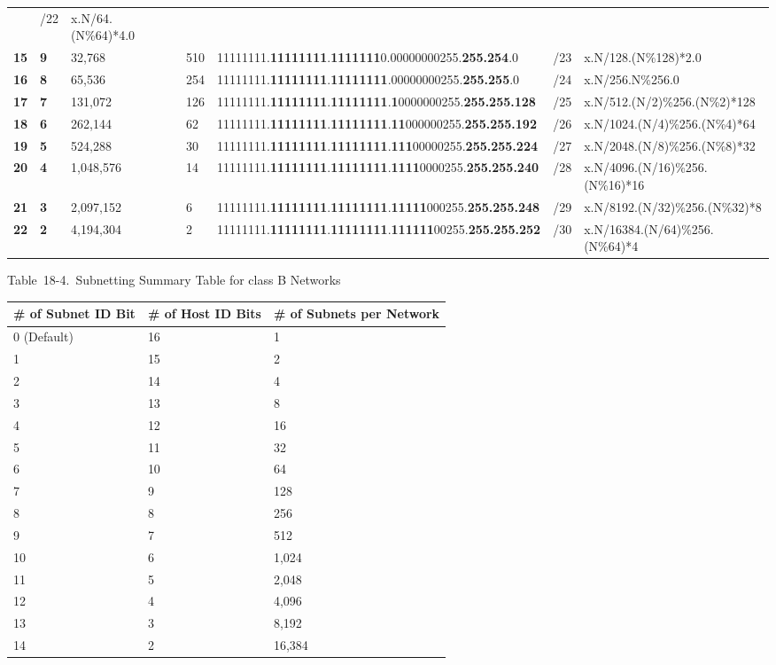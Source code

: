 \documentclass[b5paper,11pt]{memoir}
\begin{document}
\begin{longtable}[]{@{}lllllll@{}}
& /22 & x.N/64.(N\%64)*4.0\tabularnewline
{\textbf{15}} & {\textbf{9}} & 32,768 & 510 &
11111111.{\textbf{11111111}}.{\textbf{1111111}}0.00000000255.{\textbf{255.254}}.0
& /23 & x.N/128.(N\%128)*2.0\tabularnewline
{\textbf{16}} & {\textbf{8}} & 65,536 & 254 &
11111111.{\textbf{11111111}}.{\textbf{11111111}}.00000000255.{\textbf{255.255}}.0
& /24 & x.N/256.N\%256.0\tabularnewline
{\textbf{17}} & {\textbf{7}} & 131,072 & 126 &
11111111.{\textbf{11111111}}.{\textbf{11111111}}.{\textbf{1}}0000000255.{\textbf{255.255.128}}
& /25 & x.N/512.(N/2)\%256.(N\%2)*128\tabularnewline
{\textbf{18}} & {\textbf{6}} & 262,144 & 62 &
11111111.{\textbf{11111111}}.{\textbf{11111111}}.{\textbf{11}}000000255.{\textbf{255.255.192}}
& /26 & x.N/1024.(N/4)\%256.(N\%4)*64\tabularnewline
{\textbf{19}} & {\textbf{5}} & 524,288 & 30 &
11111111.{\textbf{11111111}}.{\textbf{11111111}}.{\textbf{111}}00000255.{\textbf{255.255.224}}
& /27 & x.N/2048.(N/8)\%256.(N\%8)*32\tabularnewline
{\textbf{20}} & {\textbf{4}} & 1,048,576 & 14 &
11111111.{\textbf{11111111}}.{\textbf{11111111}}.{\textbf{1111}}0000255.{\textbf{255.255.240}}
& /28 & x.N/4096.(N/16)\%256.(N\%16)*16\tabularnewline
{\textbf{21}} & {\textbf{3}} & 2,097,152 & 6 &
11111111.{\textbf{11111111}}.{\textbf{11111111}}.{\textbf{11111}}000255.{\textbf{255.255.248}}
& /29 & x.N/8192.(N/32)\%256.(N\%32)*8\tabularnewline
{\textbf{22}} & {\textbf{2}} & 4,194,304 & 2 &
11111111.{\textbf{11111111}}.{\textbf{11111111}}.{\textbf{111111}}00255.{\textbf{255.255.252}}
& /30 & x.N/16384.(N/64)\%256.(N\%64)*4\tabularnewline
\bottomrule
\end{longtable}

\protect\hypertarget{ch18s07.htmlux5cux23subnetting_summary_table_for_class_b_net}{}{}

Table~18-4.~Subnetting Summary Table for class B Networks

\begin{longtable}[]{@{}lll@{}}
\toprule
\# of Subnet ID Bit & \# of Host ID Bits & \# of Subnets per
Network\tabularnewline
\midrule
\endhead
0 (Default) & 16 & 1\tabularnewline
1 & 15 & 2\tabularnewline
2 & 14 & 4\tabularnewline
3 & 13 & 8\tabularnewline
4 & 12 & 16\tabularnewline
5 & 11 & 32\tabularnewline
6 & 10 & 64\tabularnewline
7 & 9 & 128\tabularnewline
8 & 8 & 256\tabularnewline
9 & 7 & 512\tabularnewline
10 & 6 & 1,024\tabularnewline
11 & 5 & 2,048\tabularnewline
12 & 4 & 4,096\tabularnewline
13 & 3 & 8,192\tabularnewline
14 & 2 & 16,384\tabularnewline
\bottomrule
\end{longtable}
\end{document}

